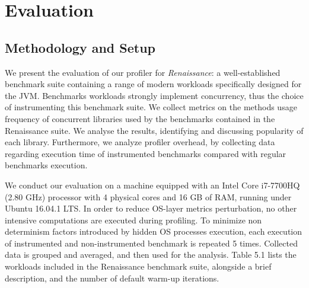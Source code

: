 \documentclass[]{usiinfthesis}
\begin{document}
\chapter{Evaluation}

\section{Methodology and Setup}
\large
We present the evaluation of our profiler for \textit{Renaissance}: a well-established benchmark suite containing a range of modern workloads specifically designed for the JVM. Benchmarks workloads strongly implement concurrency, thus the choice of instrumenting this benchmark suite. We collect metrics on the methods usage frequency of concurrent libraries used by the benchmarks contained in the Renaissance suite. We analyse the results, identifying and discussing popularity of each library. Furthermore, we analyze profiler overhead, by collecting data regarding execution time of instrumented benchmarks compared with regular benchmarks execution. 

We conduct our evaluation on a machine equipped with an Intel Core i7-7700HQ (2.80 GHz) processor with 4 physical cores and 16 GB of RAM, running under Ubuntu 16.04.1 LTS. In order to reduce OS-layer metrics perturbation, no other intensive computations are executed during profiling. To minimize non determinism factors introduced by hidden OS processes execution, each execution of instrumented and non-instrumented benchmark is repeated 5 times. Collected data is grouped and averaged, and then used for the analysis. Table 5.1 lists the workloads included in the Renaissance benchmark suite, alongside a brief description, and the number of default warm-up iterations.
\end{document}

